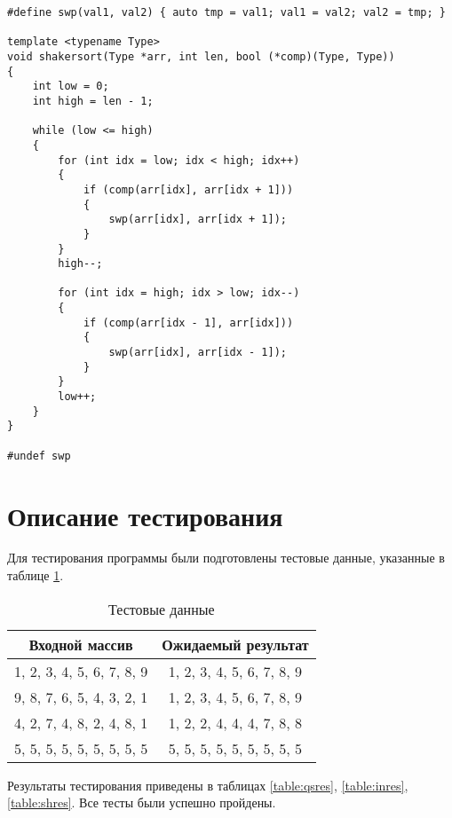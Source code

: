 \noindent\begin{minipage}{\textwidth}
\begin{lstlisting}[caption=Шейкреная сортировка, label=lst:shs]
#define swp(val1, val2) { auto tmp = val1; val1 = val2; val2 = tmp; }

template <typename Type>
void shakersort(Type *arr, int len, bool (*comp)(Type, Type))
{
    int low = 0;
    int high = len - 1;

    while (low <= high)
    {
        for (int idx = low; idx < high; idx++)
        {
            if (comp(arr[idx], arr[idx + 1]))
            {
                swp(arr[idx], arr[idx + 1]);
            }
        }
        high--;

        for (int idx = high; idx > low; idx--)
        {
            if (comp(arr[idx - 1], arr[idx]))
            {
                swp(arr[idx], arr[idx - 1]);
            }
        }
        low++;
    }
}

#undef swp
\end{lstlisting}
\end{minipage}

\section{Описание тестирования}
Для тестирования программы были подготовлены тестовые данные, указанные в таблице \ref{table:test}.

\begin{table}[H]
    \centering
    \caption{Тестовые данные}
    \label{table:test}
    \begin{tabular}{|c|c|}
        \hline
        Входной массив & Ожидаемый результат \\
        \hline
        1, 2, 3, 4, 5, 6, 7, 8, 9 & 1, 2, 3, 4, 5, 6, 7, 8, 9 \\
        \hline
        9, 8, 7, 6, 5, 4, 3, 2, 1 & 1, 2, 3, 4, 5, 6, 7, 8, 9 \\
        \hline
        4, 2, 7, 4, 8, 2, 4, 8, 1 & 1, 2, 2, 4, 4, 4, 7, 8, 8 \\
        \hline
        5, 5, 5, 5, 5, 5, 5, 5, 5 & 5, 5, 5, 5, 5, 5, 5, 5, 5 \\
        \hline
    \end{tabular}
\end{table}

Результаты тестирования приведены в таблицах \ref{table:qsres}, \ref{table:inres}, \ref{table:shres}. Все тесты были успешно пройдены.

